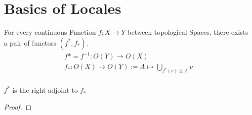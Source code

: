 
\section{Basics of Locales}

\begin{definition}[$f^*$ and $f_*$]
    \label{def:f_star}
    \leanok
    For every continuous Function $f : X \rightarrow Y$ between topological Spaces, there exists a pair of functors $(f^*,f_*)$.
    \begin{gather*}
        f* = f^{-1} : O(Y) \rightarrow O(X)\\
        f_* : O(X) \rightarrow O(Y) := A \mapsto \bigcup_{f^*(v) \le A} v\\
    \end{gather*}
\end{definition}



\begin{lemma}[$f^* \dashv f_*$]
    \label{lem:f_star_adj}
    \leanok
    $f^*$ is the right adjoint to $f_*$
\end{lemma}
\begin{proof}
    \leanok
\end{proof}

